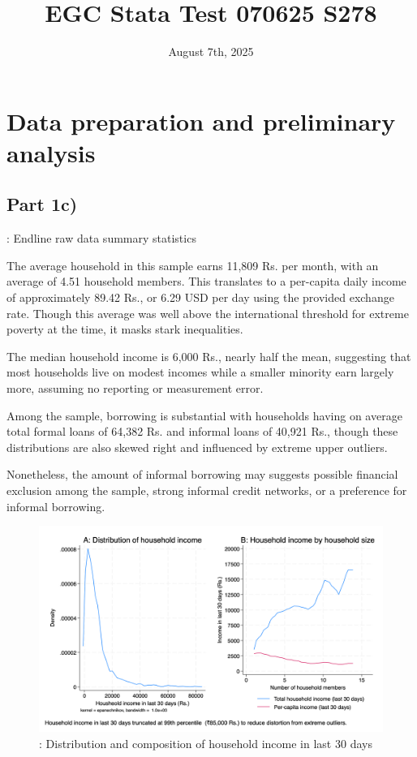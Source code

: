\documentclass[12pt]{article}
\title{EGC Stata Test 070625 S278}
\date{August 7th, 2025}
\begin{document}
\maketitle


\section*{Data preparation and preliminary analysis}

\subsection*{Part 1c)}

\begin{table}[H]
    \centering
    \scriptsize %
    \setlength{\tabcolsep}{2pt}
    \renewcommand{\arraystretch}{2}
    \resizebox{\textwidth}{!}{}
    \caption{: Endline raw data summary statistics}
\end{table}

The average household in this sample earns 11,809 Rs. per month, with an average of 4.51 household members. This translates to a per-capita daily income of approximately 89.42 Rs., or 6.29 USD per day using the provided exchange rate. Though this average was well above the international threshold for extreme poverty at the time, it masks stark inequalities.

The median household income is 6,000 Rs., nearly half the mean, suggesting that most households live on modest incomes while a smaller minority earn largely more, assuming no reporting or measurement error.

Among the sample, borrowing is substantial with households having on average total formal loans of 64,382 Rs. and informal loans of 40,921 Rs., though these distributions are also skewed right and influenced by extreme upper outliers. 



Nonetheless, the amount of informal borrowing may suggests possible financial exclusion among the sample, strong informal credit networks, or a preference for informal borrowing.


\begin{figure}[H]
    \centering
    \includegraphics[width=\textwidth]{figures/figure01_hhinc.png}
    \caption{: Distribution and composition of household income in last 30 days}
\end{figure}
\end{document}
